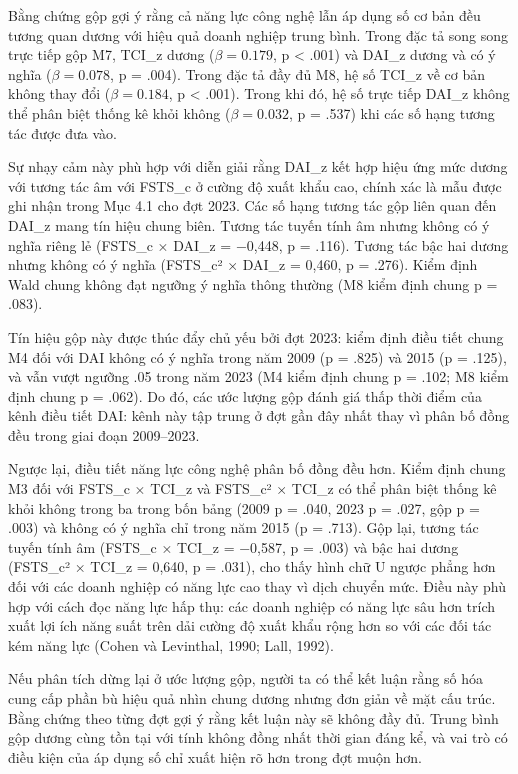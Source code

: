 \documentclass[12pt,a4paper]{article}
\begin{document}
Bằng chứng gộp gợi ý rằng cả năng lực công nghệ lẫn áp dụng số cơ bản
đều tương quan dương với hiệu quả doanh nghiệp trung bình. Trong đặc tả
song song trực tiếp gộp M7, TCI\_z dương (\(\beta = 0.179\), p
\textless{} .001) và DAI\_z dương và có ý nghĩa (\(\beta = 0.078\), p =
.004). Trong đặc tả đầy đủ M8, hệ số TCI\_z về cơ bản không thay đổi
(\(\beta = 0.184\), p \textless{} .001). Trong khi đó, hệ số trực tiếp
DAI\_z không thể phân biệt thống kê khỏi không (\(\beta = 0.032\), p =
.537) khi các số hạng tương tác được đưa vào.

Sự nhạy cảm này phù hợp với diễn giải rằng DAI\_z kết hợp hiệu ứng mức
dương với tương tác âm với FSTS\_c ở cường độ xuất khẩu cao, chính xác
là mẫu được ghi nhận trong Mục 4.1 cho đợt 2023. Các số hạng tương tác
gộp liên quan đến DAI\_z mang tín hiệu chung biên. Tương tác tuyến tính
âm nhưng không có ý nghĩa riêng lẻ (FSTS\_c × DAI\_z = −0,448, p =
.116). Tương tác bậc hai dương nhưng không có ý nghĩa (FSTS\_c² × DAI\_z
= 0,460, p = .276). Kiểm định Wald chung không đạt ngưỡng ý nghĩa thông
thường (M8 kiểm định chung p = .083).

Tín hiệu gộp này được thúc đẩy chủ yếu bởi đợt 2023: kiểm định điều tiết
chung M4 đối với DAI không có ý nghĩa trong năm 2009 (p = .825) và 2015
(p = .125), và vẫn vượt ngưỡng .05 trong năm 2023 (M4 kiểm định chung p
= .102; M8 kiểm định chung p = .062). Do đó, các ước lượng gộp đánh giá
thấp thời điểm của kênh điều tiết DAI: kênh này tập trung ở đợt gần đây
nhất thay vì phân bố đồng đều trong giai đoạn 2009--2023.

Ngược lại, điều tiết năng lực công nghệ phân bố đồng đều hơn. Kiểm định
chung M3 đối với FSTS\_c × TCI\_z và FSTS\_c² × TCI\_z có thể phân biệt
thống kê khỏi không trong ba trong bốn bảng (2009 p = .040, 2023 p =
.027, gộp p = .003) và không có ý nghĩa chỉ trong năm 2015 (p = .713).
Gộp lại, tương tác tuyến tính âm (FSTS\_c × TCI\_z = −0,587, p = .003)
và bậc hai dương (FSTS\_c² × TCI\_z = 0,640, p = .031), cho thấy hình
chữ U ngược phẳng hơn đối với các doanh nghiệp có năng lực cao thay vì
dịch chuyển mức. Điều này phù hợp với cách đọc năng lực hấp thụ: các
doanh nghiệp có năng lực sâu hơn trích xuất lợi ích năng suất trên dải
cường độ xuất khẩu rộng hơn so với các đối tác kém năng lực (Cohen và
Levinthal, 1990; Lall, 1992).

Nếu phân tích dừng lại ở ước lượng gộp, người ta có thể kết luận rằng số
hóa cung cấp phần bù hiệu quả nhìn chung dương nhưng đơn giản về mặt cấu
trúc. Bằng chứng theo từng đợt gợi ý rằng kết luận này sẽ không đầy đủ.
Trung bình gộp dương cùng tồn tại với tính không đồng nhất thời gian
đáng kể, và vai trò có điều kiện của áp dụng số chỉ xuất hiện rõ hơn
trong đợt muộn hơn.
\end{document}
